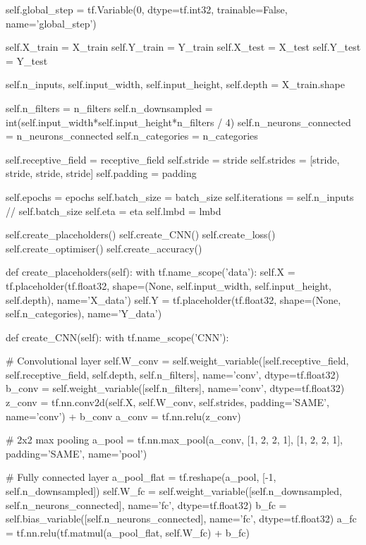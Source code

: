 \documentclass[%
oneside,                 %
final,                   %
10pt]{article}
\begin{document}
        self.global_step = tf.Variable(0, dtype=tf.int32, trainable=False, name='global_step')
        
        self.X_train = X_train
        self.Y_train = Y_train
        self.X_test = X_test
        self.Y_test = Y_test
        
        self.n_inputs, self.input_width, self.input_height, self.depth = X_train.shape
        
        self.n_filters = n_filters
        self.n_downsampled = int(self.input_width*self.input_height*n_filters / 4)
        self.n_neurons_connected = n_neurons_connected
        self.n_categories = n_categories
        
        self.receptive_field = receptive_field
        self.stride = stride
        self.strides = [stride, stride, stride, stride]
        self.padding = padding
        
        self.epochs = epochs
        self.batch_size = batch_size
        self.iterations = self.n_inputs // self.batch_size
        self.eta = eta
        self.lmbd = lmbd
        
        self.create_placeholders()
        self.create_CNN()
        self.create_loss()
        self.create_optimiser()
        self.create_accuracy()
    
    def create_placeholders(self):
        with tf.name_scope('data'):
            self.X = tf.placeholder(tf.float32, shape=(None, self.input_width, self.input_height, self.depth), name='X_data')
            self.Y = tf.placeholder(tf.float32, shape=(None, self.n_categories), name='Y_data')
    
    def create_CNN(self):
        with tf.name_scope('CNN'):
            
            # Convolutional layer
            self.W_conv = self.weight_variable([self.receptive_field, self.receptive_field, self.depth, self.n_filters], name='conv', dtype=tf.float32)
            b_conv = self.weight_variable([self.n_filters], name='conv', dtype=tf.float32)
            z_conv = tf.nn.conv2d(self.X, self.W_conv, self.strides, padding='SAME', name='conv') + b_conv
            a_conv = tf.nn.relu(z_conv)
            
            # 2x2 max pooling
            a_pool = tf.nn.max_pool(a_conv, [1, 2, 2, 1], [1, 2, 2, 1], padding='SAME', name='pool')
            
            # Fully connected layer
            a_pool_flat = tf.reshape(a_pool, [-1, self.n_downsampled])
            self.W_fc = self.weight_variable([self.n_downsampled, self.n_neurons_connected], name='fc', dtype=tf.float32)
            b_fc = self.bias_variable([self.n_neurons_connected], name='fc', dtype=tf.float32)
            a_fc = tf.nn.relu(tf.matmul(a_pool_flat, self.W_fc) + b_fc)
            
\end{document}
